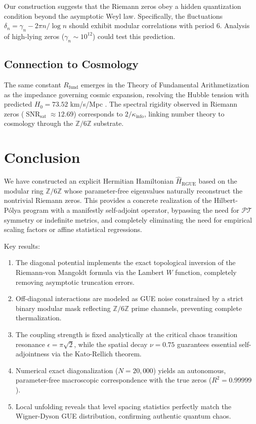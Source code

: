 \documentclass[prl,aps,floatfix,superscriptaddress,10pt]{revtex4-2}
\newcommand{\Zmod}{\mathbb{Z}/6\mathbb{Z}}
\newcommand{\SNR}{\operatorname{SNR}}
\newcommand{\Rfund}{R_{\text{fund}}}
\newcommand{\Kinfo}{\kappa_{\text{info}}}
\begin{document}
Our construction suggests that the Riemann zeros obey a hidden quantization condition beyond the asymptotic Weyl law.
Specifically, the fluctuations $\delta_n = \gamma_n - 2\pi n/\log n$ should exhibit modular correlations with period 6. Analysis of high-lying zeros ($\gamma_n \sim 10^{12}$) could test this prediction.

\subsection{Connection to Cosmology}

The same constant $\Rfund$ emerges in the Theory of Fundamental Arithmetization as the impedance governing cosmic expansion, resolving the Hubble tension with predicted $H_0 = 73.52$ km/s/Mpc \cite{PeinadorGenesis}.
The spectral rigidity observed in Riemann zeros ($\SNR_{\text{sat}} \approx 12.69$) corresponds to $2/\Kinfo$, linking number theory to cosmology through the $\Zmod$ substrate.

\section{Conclusion}

We have constructed an explicit Hermitian Hamiltonian $\hat{H}_{\text{RGUE}}$ based on the modular ring $\mathbb{Z}/6\mathbb{Z}$ whose parameter-free eigenvalues naturally reconstruct the nontrivial Riemann zeros. This provides a concrete realization of the Hilbert-P\'olya program with a manifestly self-adjoint operator, bypassing the need for $\mathcal{PT}$ symmetry or indefinite metrics, and completely eliminating the need for empirical scaling factors or affine statistical regressions.

Key results:
\begin{enumerate}
    \item The diagonal potential implements the exact topological inversion of the Riemann-von Mangoldt formula via the Lambert $W$ function, completely removing asymptotic truncation errors.
    \item Off-diagonal interactions are modeled as GUE noise constrained by a strict binary modular mask reflecting $\Zmod$ prime channels, preventing complete thermalization.
    \item The coupling strength is fixed analytically at the critical chaos transition resonance $\epsilon = \pi \sqrt{2}$, while the spatial decay $\nu = 0.75$ guarantees essential self-adjointness via the Kato-Rellich theorem.
    \item Numerical exact diagonalization ($N=20,000$) yields an autonomous, parameter-free macroscopic correspondence with the true zeros ($R^2 = 0.99999$).
    \item Local unfolding reveals that level spacing statistics perfectly match the Wigner-Dyson GUE distribution, confirming authentic quantum chaos.
\end{enumerate}
\end{document}
